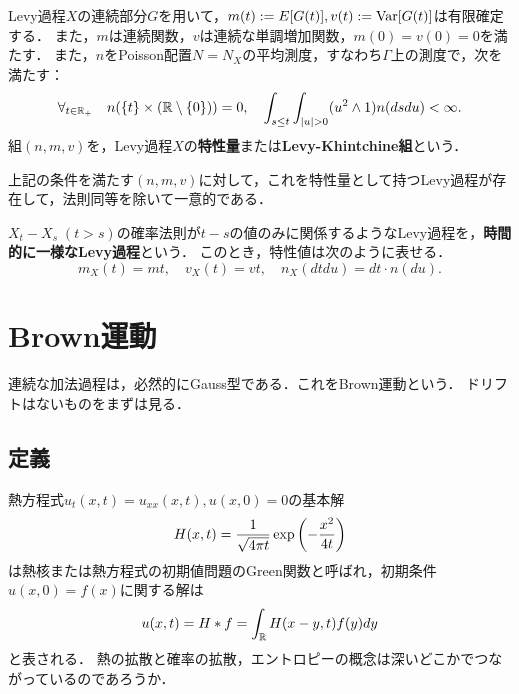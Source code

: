 \documentclass[uplatex,dvipdfmx]{jsreport}
\begin{document}
\begin{definition}
    Levy過程$X$の連続部分$G$を用いて，$m(t):=E[G(t)],v(t):=\mathrm{Var}[G(t)]$は有限確定する．
    また，$m$は連続関数，$v$は連続な単調増加関数，$m(0)=v(0)=0$を満たす．
    また，$n$をPoisson配置$N=N_X$の平均測度，すなわち$\Gamma$上の測度で，次を満たす：
    \[\forall_{t\in\mathbb{R}_+}\quad n(\{t\}\times(\mathbb{R}\setminus\{0\}))=0,\quad\int_{s\le t}\int_{\lvert u\rvert>0}(u^2\land 1)n(dsdu)<\infty.\]
    組$(n,m,v)$を，Levy過程$X$の\textbf{特性量}または\textbf{Levy-Khintchine組}という．
\end{definition}

\begin{theorem}
    上記の条件を満たす$(n,m,v)$に対して，これを特性量として持つLevy過程が存在して，法則同等を除いて一意的である．
\end{theorem}

\begin{definition}
    $X_t-X_s\;(t>s)$の確率法則が$t-s$の値のみに関係するようなLevy過程を，\textbf{時間的に一様なLevy過程}という．
    このとき，特性値は次のように表せる．
    \[m_X(t)=mt,\quad v_X(t)=vt,\quad n_X(dtdu)=dt\cdot n(du).\]
\end{definition}

\section{Brown運動}

\begin{tcolorbox}[colframe=ForestGreen, colback=ForestGreen!10!white,breakable,colbacktitle=ForestGreen!40!white,coltitle=black,fonttitle=\bfseries\sffamily,
title=]
    連続な加法過程は，必然的にGauss型である．これをBrown運動という．
    ドリフトはないものをまずは見る．
\end{tcolorbox}

\subsection{定義}

\begin{tcolorbox}[colframe=ForestGreen, colback=ForestGreen!10!white,breakable,colbacktitle=ForestGreen!40!white,coltitle=black,fonttitle=\bfseries\sffamily,
title=]
    熱方程式$u_t(x,t)=u_{xx}(x,t),u(x,0)=0$の基本解
    \[H(x,t)=\frac{1}{\sqrt{4\pi t}}\exp\left(-\frac{x^2}{4t}\right)\]
    は熱核または熱方程式の初期値問題のGreen関数と呼ばれ，初期条件$u(x,0)=f(x)$に関する解は
    \[u(x,t)=H*f=\int_{\mathbb{R}} H(x-y,t)f(y)dy\]
    と表される．
    熱の拡散と確率の拡散，エントロピーの概念は深いどこかでつながっているのであろうか．
\end{tcolorbox}
\end{document}
